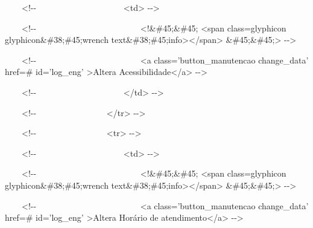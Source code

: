 {\ttfamily\color[rgb]{0.10980392,0.10980392,0.10980392}
    \ \ \ \ {\textless}!-{}- \ \ \ \ \ \ \ \ \ \ \ \ \ \ \ \ \ \ \ \ {\textless}td{\textgreater} -{}-{\textgreater}}

{\ttfamily\color[rgb]{0.10980392,0.10980392,0.10980392}
    \ \ \ \ {\textless}!-{}- \ \ \ \ \ \ \ \ \ \ \ \ \ \ \ \ \ \ \ \ \ \ \ \ {\textless}!\&\#45;\&\#45; {\textless}span
        class={\textquotedbl}glyphicon glyphicon\&\#38;\#45;wrench
        text\&\#38;\#45;info{\textquotedbl}{\textgreater}{\textless}/span{\textgreater} \&\#45;\&\#45;{\textgreater}
    -{}-{\textgreater}}

{\ttfamily\color[rgb]{0.10980392,0.10980392,0.10980392}
    \ \ \ \ {\textless}!-{}- \ \ \ \ \ \ \ \ \ \ \ \ \ \ \ \ \ \ \ \ \ \ \ \ {\textless}a class='button\_manutencao
        change\_data' href={\textquotedbl}\#{\textquotedbl} id='log\_eng' {\textgreater}Altera
        Acessibilidade{\textless}/a{\textgreater} -{}-{\textgreater}}

{\ttfamily\color[rgb]{0.10980392,0.10980392,0.10980392}
    \ \ \ \ {\textless}!-{}- \ \ \ \ \ \ \ \ \ \ \ \ \ \ \ \ \ \ \ \ {\textless}/td{\textgreater} -{}-{\textgreater}}

{\ttfamily\color[rgb]{0.10980392,0.10980392,0.10980392}
    \ \ \ \ {\textless}!-{}- \ \ \ \ \ \ \ \ \ \ \ \ \ \ \ \ {\textless}/tr{\textgreater} -{}-{\textgreater}}

{\ttfamily\color[rgb]{0.10980392,0.10980392,0.10980392}
    \ \ \ \ {\textless}!-{}- \ \ \ \ \ \ \ \ \ \ \ \ \ \ \ \ {\textless}tr{\textgreater} -{}-{\textgreater}}

{\ttfamily\color[rgb]{0.10980392,0.10980392,0.10980392}
    \ \ \ \ {\textless}!-{}- \ \ \ \ \ \ \ \ \ \ \ \ \ \ \ \ \ \ \ \ {\textless}td{\textgreater} -{}-{\textgreater}}

{\ttfamily\color[rgb]{0.10980392,0.10980392,0.10980392}
    \ \ \ \ {\textless}!-{}- \ \ \ \ \ \ \ \ \ \ \ \ \ \ \ \ \ \ \ \ \ \ \ \ {\textless}!\&\#45;\&\#45; {\textless}span
        class={\textquotedbl}glyphicon glyphicon\&\#38;\#45;wrench
        text\&\#38;\#45;info{\textquotedbl}{\textgreater}{\textless}/span{\textgreater} \&\#45;\&\#45;{\textgreater}
    -{}-{\textgreater}}

{\ttfamily\color[rgb]{0.10980392,0.10980392,0.10980392}
    \ \ \ \ {\textless}!-{}- \ \ \ \ \ \ \ \ \ \ \ \ \ \ \ \ \ \ \ \ \ \ \ \ {\textless}a class='button\_manutencao
        change\_data' href={\textquotedbl}\#{\textquotedbl} id='log\_eng' {\textgreater}Altera Hor\'ario de
        atendimento{\textless}/a{\textgreater} -{}-{\textgreater}}

